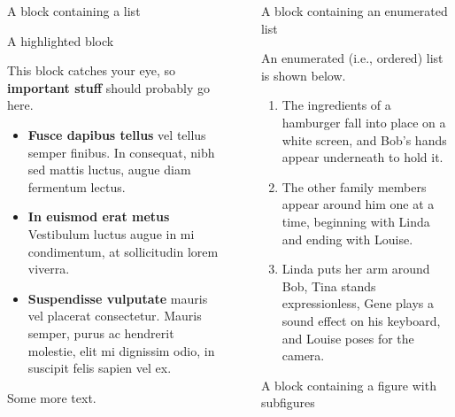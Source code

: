 \documentclass[final]{beamer}
\newlength{\sepwidth}
\newlength{\colwidth}
\newcommand{\separatorcolumn}{\begin{column}{\sepwidth}\end{column}}
\begin{document}
\begin{frame}[t]
\begin{columns}[t]
\begin{column}{\colwidth}
\begin{block}{A block containing a list}
  \end{block}

  \begin{alertblock}{A highlighted block}

    This block catches your eye, so \textbf{important stuff} should probably go
    here.


    \begin{itemize}
      \item \textbf{Fusce dapibus tellus} vel tellus semper finibus. 
        In consequat, nibh sed mattis luctus, augue diam fermentum lectus.
      \item \textbf{In euismod erat metus} Vestibulum luctus augue in mi condimentum, at sollicitudin lorem viverra.
      \item \textbf{Suspendisse vulputate} mauris vel placerat consectetur.
        Mauris semper, purus ac hendrerit molestie, elit mi dignissim odio, in suscipit felis sapien vel ex.
    \end{itemize}

    Some more text.

  \end{alertblock}

\end{column}

\separatorcolumn

\begin{column}{\colwidth}

  \begin{block}{A block containing an enumerated list}

    An enumerated (i.e., ordered) list is shown below. 

    \begin{enumerate}
      \item The ingredients of a hamburger fall into place on a white screen, and Bob's hands appear underneath to hold it.
      \item The other family members appear around him one at a time, beginning with Linda and ending with Louise.
      \item Linda puts her arm around Bob, Tina stands expressionless, Gene plays a sound effect on his keyboard, and Louise poses for the camera.
    \end{enumerate}

  \end{block}

  \begin{block}{A block containing a figure with subfigures}


\end{block}
\end{column}
\end{columns}
\end{frame}
\end{document}

